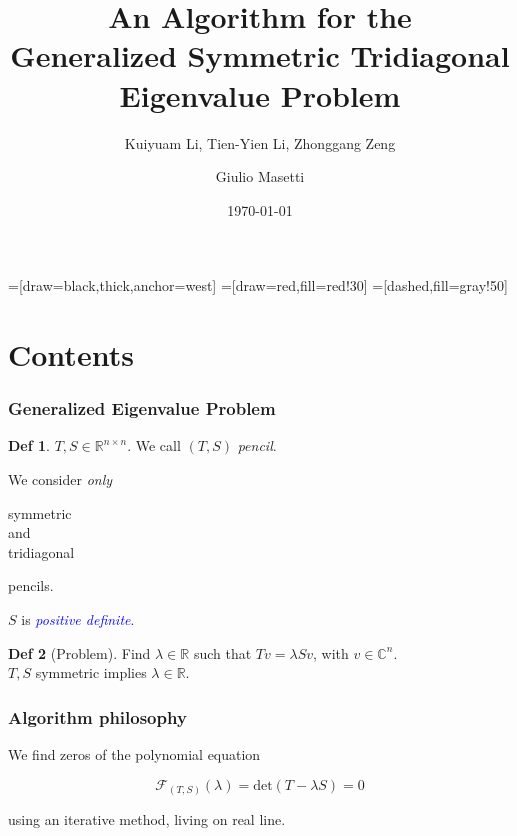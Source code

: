 \documentclass{beamer}
\title{An Algorithm for the \\
Generalized Symmetric Tridiagonal \\
Eigenvalue Problem}
\subtitle{Kuiyuam Li, Tien-Yien Li, Zhonggang Zeng}
\author{Giulio Masetti}
\institute{Universit\`a di Pisa\\
Metodi di Approssimazione 2012-2013
}
\date{\today}
\newcommand{\R}{\mathbb{R}}
\newcommand{\C}{\mathbb{C}}
\newcommand{\effe}[2]{\mathcal{F}_{#1}(#2)}
\newcommand{\deter}[1]{\mathrm{det}(#1)}
\newcommand{\tc}{ $ such that $ }
\theoremstyle{definition} \newtheorem{de}{Def}
\theoremstyle{remark} \newtheorem{os}[de]{Remark}
\theoremstyle{plain} \newtheorem{te}[de]{Teo}
\theoremstyle{plain} \newtheorem{co}[de]{Cor}
\theoremstyle{plain} \newtheorem{pr}[de]{Prop}
\theoremstyle{plain} \newtheorem{lem}[de]{Lemm}
\theoremstyle{remark} \newtheorem{rem}[de]{Remark}
\begin{document}
\long{} 

=[draw=black,thick,anchor=west]
=[draw=red,fill=red!30]
=[dashed,fill=gray!50]

\newenvironment{fminipage}%
{\begin{Sbox}\begin{minipage}}%
{\end{minipage}
\end{Sbox}
\fbox{\TheSbox}}

\begin{frame}
  \titlepage
\end{frame}


\section{Contents}

\begin{frame} 
\frametitle{Generalized Eigenvalue Problem}  

\begin{de}
  $T,S\in\R^{n\times n}$. We call $(T,S)$ \emph{pencil}.
\end{de}

We consider \emph{only} \begin{fminipage}{0.8in} symmetric \\ and \\ 
tridiagonal\end{fminipage} pencils.

\pause

$S$ is \textcolor{blue}{\emph{positive definite}}.

\pause

\begin{de}[Problem]
  Find $\lambda\in\R \tc T v = \lambda S v$, with $v\in\C^n$. \\
  $T,S$ symmetric implies $\lambda\in\R$.
\end{de}
\end{frame}

\begin{frame}
\frametitle{Algorithm philosophy}

We find zeros of the polynomial equation

\begin{equation*}
  \effe{(T,S)}{\lambda} = \deter{T-\lambda S} = 0
\end{equation*}

using an iterative method, living on real line.
\end{frame}
\end{document}
